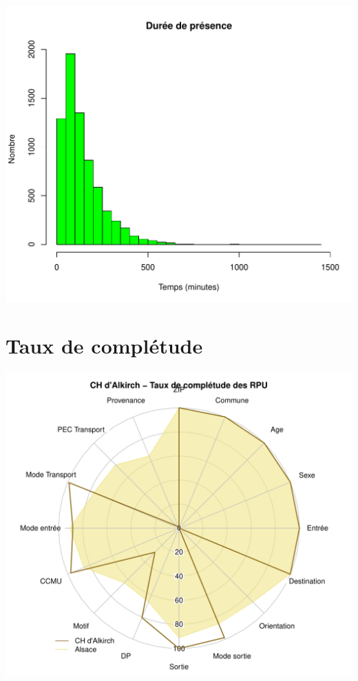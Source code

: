 \documentclass[12pt,english,french,twoside]{book}\usepackage[]{graphicx}\usepackage[]{color}
\makeatletter
\def\maxwidth{ %
  \ifdim\Gin@nat@width>\linewidth
    \linewidth
  \else
    \Gin@nat@width
  \fi
}
\newenvironment{knitrout}{}{} %
\makeatother
\begin{document}
\begin{knitrout}
\color{fgcolor}
\includegraphics[width=\maxwidth]{figure/graphe_p_alk} 

\end{knitrout}


\section*{Taux de complétude}

\begin{knitrout}
\color{fgcolor}
\includegraphics[width=\maxwidth]{figure/compl_alk} 

\end{knitrout}
\end{document}
